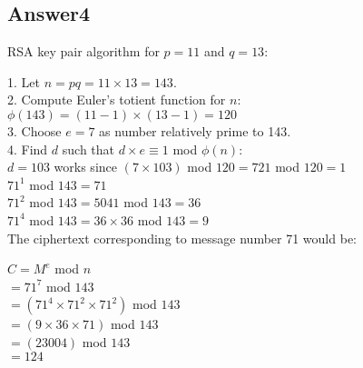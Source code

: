 \documentclass[twoside]{article}
\begin{document}
\subsection{Answer4}

RSA key pair algorithm for $p = 11$ and $q = 13$:

1. Let $n = pq = 11 \times 13 = 143$. \\
2. Compute Euler's totient function for $n$: \\
\hspace*{4mm}$\phi(143) = (11-1) \times (13-1) = 120$ \\
3. Choose $e = 7$ as number relatively prime to 143. \\
4. Find $d$ such that $d \times e \equiv  1$ mod $\phi(n)$: \\
\hspace*{4mm} $d = 103$ works since $(7 \times 103)$ mod $120 = 721$ mod $120 = 1$\\

$71^{1}$ mod $143 = 71$ \\
$71^{2}$ mod $143 = 5041$ mod $143 = 36$\\
$71^{4}$ mod $143 = 36 \times 36$ mod $143 = 9$\\

The ciphertext corresponding to message number 71 would be:

$C = M^{e}$ mod $n$ \\
\hspace*{4mm}$= 71^{7}$ mod $143$ \\
\hspace*{4mm}$= (71^{4} \times 71^{2} \times 71^{2})$ mod $143$\\
\hspace*{4mm}$= (9 \times 36 \times 71)$ mod $143$ \\
\hspace*{4mm}$= (23004)$ mod $143$ \\
\hspace*{4mm}$= 124$
\end{document}
